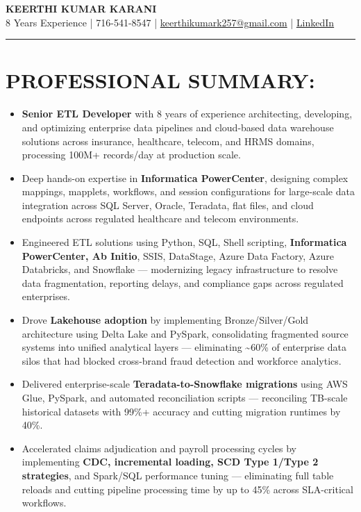 \documentclass[a4paper,10pt]{article}
\begin{document}
\begin{center}
    {\LARGE \textbf{KEERTHI KUMAR KARANI}} \\
    \vspace{6pt}
    8 Years Experience | 716-541-8547 | \href{mailto:keerthikumark257@gmail.com}{keerthikumark257@gmail.com} | \href{https://www.linkedin.com}{LinkedIn}
\end{center}
\hrule
\vspace{6pt}

\section*{PROFESSIONAL SUMMARY:}
\begin{itemize}
    \item \textbf{Senior ETL Developer} with 8 years of experience architecting, developing, and optimizing enterprise data pipelines and cloud-based data warehouse solutions across insurance, healthcare, telecom, and HRMS domains, processing 100M+ records/day at production scale.
    \item Deep hands-on expertise in \textbf{Informatica PowerCenter}, designing complex mappings, mapplets, workflows, and session configurations for large-scale data integration across SQL Server, Oracle, Teradata, flat files, and cloud endpoints across regulated healthcare and telecom environments.
    \item Engineered ETL solutions using Python, SQL, Shell scripting, \textbf{Informatica PowerCenter, Ab Initio}, SSIS, DataStage, Azure Data Factory, Azure Databricks, and Snowflake — modernizing legacy infrastructure to resolve data fragmentation, reporting delays, and compliance gaps across regulated enterprises.
    \item Drove \textbf{Lakehouse adoption} by implementing Bronze/Silver/Gold architecture using Delta Lake and PySpark, consolidating fragmented source systems into unified analytical layers — eliminating \textasciitilde 60\% of enterprise data silos that had blocked cross-brand fraud detection and workforce analytics.
    \item Delivered enterprise-scale \textbf{Teradata-to-Snowflake migrations} using AWS Glue, PySpark, and automated reconciliation scripts — reconciling TB-scale historical datasets with 99\%+ accuracy and cutting migration runtimes by 40\%.
    \item Accelerated claims adjudication and payroll processing cycles by implementing \textbf{CDC, incremental loading, SCD Type 1/Type 2 strategies}, and Spark/SQL performance tuning — eliminating full table reloads and cutting pipeline processing time by up to 45\% across SLA-critical workflows.

\end{itemize}
\end{document}
